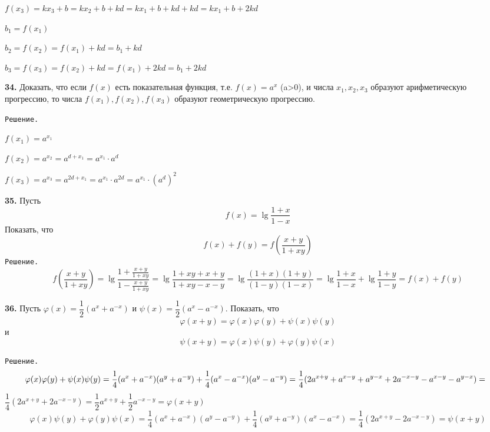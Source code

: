 \documentclass[12pt]{article}
\begin{document}
	$f(x_3) = kx_3+b = kx_2+b+kd = kx_1+b+kd+kd= kx_1+b+2kd$
	
	$b_1 = f(x_1)$
	
	$b_2 = f(x_2) = f(x_1)+kd = b_1+kd$
	
	$b_3 = f(x_3) = f(x_2)+kd = f(x_1)+2kd = b_1+2kd$ 
	
	\hspace{-3mm}{\it Доказано}\vspace{2mm}
	
	{\bf 34.} Доказать, что если $f(x)$ есть показательная функция, т.е. $f(x)=a^x$ (a>0), и числа $x_1,x_2,x_3$ образуют арифметическую прогрессию, то числа $f(x_1),f(x_2),f(x_3)$ образуют геометрическую прогрессию.
	
	{\tt Решение.}
	
	$f(x_1) = a^{x_1} $
	
	$f(x_2) = a^{x_2} = a^{d+x_1} = a^{x_1}\cdot a^d$
	
	$f(x_3) = a^{x_3} = a^{2d+x_1} = a^{x_1}\cdot a^{2d} = a^{x_1}\cdot (a^d)^2$ 
	
	\hspace{-3mm}{\it Доказано.}\vspace{2mm}
	
	{\bf 35.} Пусть
	\[
		f(x) = \lg \dfrac{1+x}{1-x}
	\]
	Показать, что
	\[
		f(x)+f(y) = f\left(\dfrac{x+y}{1+xy}\right)
	\]
	{\tt Решение.}
	\[
f\left(\dfrac{x+y}{1+xy}\right) = \lg\dfrac{1+\frac{x+y}{1+xy}}{1-\frac{x+y}{1+xy}} = \lg \dfrac{1+xy+x+y}{1+xy-x-y}  = \lg\dfrac{(1+x)(1+y)}{(1-y)(1-x)} = \lg\dfrac{1+x}{1-x}+\lg\dfrac{1+y}{1-y} = f(x)+f(y)
	\]
	
	\hspace{-3mm}{\it Доказано.}\vspace{2mm}

{\bf 36.} Пусть $\varphi(x) = \dfrac{1}{2}(a^x+a^{-x})$ и $\psi(x) = \dfrac{1}{2}(a^x-a^{-x})$. Показать, что\[
	\varphi(x+y) = \varphi(x)\varphi(y)+\psi(x)\psi(y)
\]	и\[
	\psi(x+y) = \varphi(x)\psi(y) + \varphi(y)\psi(x)
\]

{\tt Решение.}
\[
\hspace{-2mm}\varphi(x)\varphi(y)+\psi(x)\psi(y) = \dfrac{1}{4}(a^x+a^{-x})(a^y+a^{-y}) +\dfrac{1}{4}(a^x-a^{-x})(a^y-a^{-y}) = \dfrac{1}{4}(2a^{x+y}+a^{x-y}+a^{y-x}+2a^{-x-y}-a^{x-y}-a^{y-x})=
\]
$
\dfrac{1}{4}(2a^{x+y}+2a^{-x-y}) = \dfrac{1}{2}a^{x+y}+\dfrac{1}{2}a^{-x-y}=\varphi(x+y)
$\[
\varphi(x)\psi(y) + \varphi(y)\psi(x) = \dfrac{1}{4}(a^x+a^{-x})(a^y-a^{-y})+\dfrac{1}{4}(a^y+a^{-y})(a^x-a^{-x}) = \dfrac{1}{4}(2a^{x+y}-2a^{-x-y}) = \psi(x+y)
\]
\end{document}
